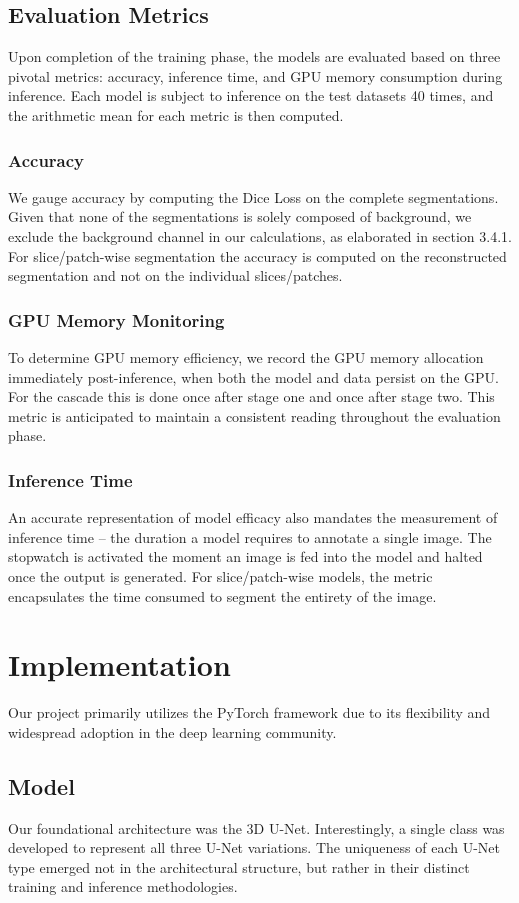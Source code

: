 \section{Evaluation Metrics}
Upon completion of the training phase, the models are evaluated based on three pivotal metrics: accuracy, inference time, and GPU memory consumption during inference.
Each model is subject to inference on the test datasets 40 times, and the arithmetic mean for each metric is then computed.

\subsection{Accuracy}
We gauge accuracy by computing the Dice Loss on the complete segmentations. Given that none of the segmentations is solely composed of background, we exclude the background channel in our calculations,
as elaborated in section 3.4.1. For slice/patch-wise segmentation the accuracy is computed on the reconstructed segmentation and not on the individual slices/patches.

\subsection{GPU Memory Monitoring}
To determine GPU memory efficiency, we record the GPU memory allocation immediately post-inference, when both the model and data persist on the GPU.
For the cascade this is done once after stage one and once after stage two. This metric is anticipated to maintain a consistent reading throughout the evaluation phase.

\subsection{Inference Time}
An accurate representation of model efficacy also mandates the measurement of inference time – the duration a model requires to annotate a single image.
The stopwatch is activated the moment an image is fed into the model and halted once the output is generated. For slice/patch-wise models,
the metric encapsulates the time consumed to segment the entirety of the image.

\chapter{Implementation}
Our project primarily utilizes the PyTorch framework due to its flexibility and widespread adoption in the deep learning community.
\section{Model}
Our foundational architecture was the 3D U-Net. Interestingly, a single class was developed to represent all three U-Net variations. The uniqueness of each U-Net type emerged not in the architectural structure,
but rather in their distinct training and inference methodologies.
